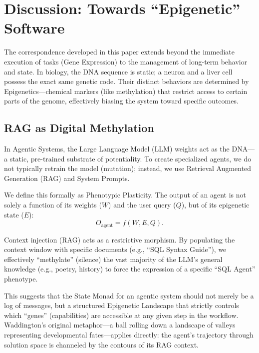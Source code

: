 \section{Discussion: Towards ``Epigenetic'' Software}\label{sec:discussion}

The correspondence developed in this paper extends beyond the immediate execution of tasks (Gene Expression) to the
management of long-term behavior and state. In biology, the DNA sequence is static; a neuron and a liver cell
possess the exact same genetic code. Their distinct behaviors are determined by Epigenetics---chemical markers
(like methylation) that restrict access to certain parts of the genome, effectively biasing the system toward
specific outcomes.

\subsection{RAG as Digital Methylation}

In Agentic Systems, the Large Language Model (LLM) weights act as the DNA---a static, pre-trained substrate of
potentiality. To create specialized agents, we do not typically retrain the model (mutation); instead, we use
Retrieval Augmented Generation (RAG) and System Prompts.

We define this formally as Phenotypic Plasticity. The output of an agent is not solely a function of its weights
($W$) and the user query ($Q$), but of its epigenetic state ($E$):
\begin{equation}
O_{\text{agent}} = f(W,E,Q).
\label{eq:phenotypic-plasticity}
\end{equation}

Context injection (RAG) acts as a restrictive morphism. By populating the context window with specific documents
(e.g., ``SQL Syntax Guide''), we effectively ``methylate'' (silence) the vast majority of the LLM's general
knowledge (e.g., poetry, history) to force the expression of a specific ``SQL Agent'' phenotype.

This suggests that the State Monad for an agentic system should not merely be a log of messages, but a structured
Epigenetic Landscape \cite{waddington1957} that strictly controls which ``genes'' (capabilities) are accessible
at any given step in the workflow. Waddington's original metaphor---a ball rolling down a landscape of valleys
representing developmental fates---applies directly: the agent's trajectory through solution space is channeled
by the contours of its RAG context.

